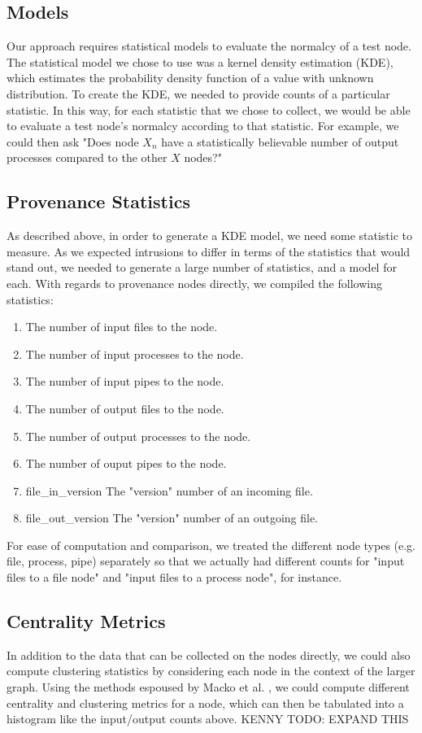 \documentclass[10pt,twocolumn]{article}
\begin{document}
\subsection{Models}
Our approach requires statistical models to evaluate the normalcy of a test node. The statistical model we chose to use was a kernel density estimation (KDE), which estimates the probability density function of a value with unknown distribution. To create the KDE, we needed to provide counts of a particular statistic. In this way, for each statistic that we chose to collect, we would be able to evaluate a test node's normalcy according to that statistic. For example, we could then ask "Does node $X_n$ have a statistically believable number of output processes compared to the other $X$ nodes?"
\subsection{Provenance Statistics}
As described above, in order to generate a KDE model, we need some statistic to measure. As we expected intrusions to differ in terms of the statistics that would stand out, we needed to generate a large number of statistics, and a model for each. With regards to provenance nodes directly, we compiled the following statistics:
\begin{enumerate}
\item The number of input files to the node.
\item The number of input processes to the node.
\item The number of input pipes to the node.
\item The number of output files to the node.
\item The number of output processes to the node.
\item The number of ouput pipes to the node.
\item file\_in\_version The "version" number of an incoming file.
\item file\_out\_version The "version" number of an outgoing file.
\end{enumerate}
For ease of computation and comparison, we treated the different node types (e.g. file, process, pipe) separately so that we actually had different counts for "input files to a file node" and "input files to a process node", for instance.
\subsection{Centrality Metrics}
In addition to the data that can be collected on the nodes directly, we could also compute clustering statistics by considering each node in the context of the larger graph. Using the methods espoused by Macko et al. \cite{clustering}, we could compute different centrality and clustering metrics for a node, which can then be tabulated into a histogram like the input/output counts above. 
KENNY TODO: EXPAND THIS
\end{document}
